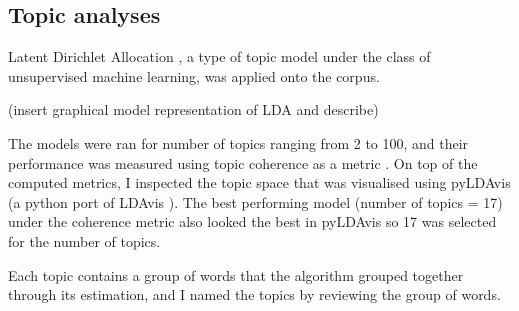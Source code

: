 \subsection{Topic analyses}

Latent Dirichlet Allocation \parencite{blei2003latent}, a type of topic model under the class of unsupervised machine learning, was applied onto the corpus. 

(insert graphical model representation of LDA and describe)

The models were ran for number of topics ranging from 2 to 100, and their performance was measured using topic coherence as a metric \parencite{roder2015exploring}. On top of the computed metrics, I inspected the topic space that was visualised using pyLDAvis (a python port of LDAvis \parencite{sievert2014ldavis}). The best performing model (number of topics = 17) under the coherence metric also looked the best in pyLDAvis so 17 was selected for the number of topics.

Each topic contains a group of words that the algorithm grouped together through its estimation, and I named the topics by reviewing the group of words.

